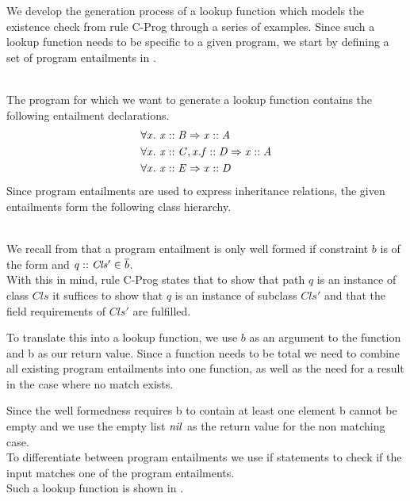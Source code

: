 We develop the generation process of a lookup function which models
the existence check from rule C-Prog through a series of examples.
Since such a lookup function needs to be specific to a given program,
we start by defining a set of program entailments in .
%
\begin{example}\quad\\
\label{ex:progent-inheritance}
The program for which we want to generate a lookup function
contains the following entailment declarations.
\begin{align*}
& \forall \mathit{x}.\ \mathit{\mathit{x} :: \mathit{B}} \Rightarrow \mathit{\mathit{x} :: \mathit{A}}\\
& \forall \mathit{x}.\ \mathit{\mathit{x} :: \mathit{C}, \mathit{x.f} :: \mathit{D}} \Rightarrow \mathit{\mathit{x} :: \mathit{A}}\\
& \forall \mathit{x}.\ \mathit{\mathit{x} :: \mathit{E}} \Rightarrow \mathit{\mathit{x} :: \mathit{D}}
\end{align*}
Since program entailments are used to express inheritance relations,
the given entailments form the following class hierarchy.
\begin{center}
\end{center}
\end{example}\quad\\
We recall from  that a program entailment 
is only well formed if constraint $b$ is
of the form  and $\mathit{q} :: \mathit{Cls'} \in \overline{b}$.\\
With this in mind, rule C-Prog states that to show that
path $q$ is an instance of class $Cls$ it suffices to show
that $q$ is an instance of subclass $Cls'$
and that the field requirements of $Cls'$ are fulfilled.

To translate this into a lookup function,
we use $b$ as an argument to the function and \ovl b as our return value.
Since a function needs to be total we need to combine all
existing program entailments into one function,
as well as the need for a result in the case where no match exists.

Since the well formedness requires \ovl b to contain at least
one element \ovl b cannot be empty and we use the
empty list $\mathit{nil}$ as the return value for the non matching case.\\
To differentiate between program entailments we use if statements
to check if the input matches one of the program entailments.\\
Such a lookup function is shown in .

